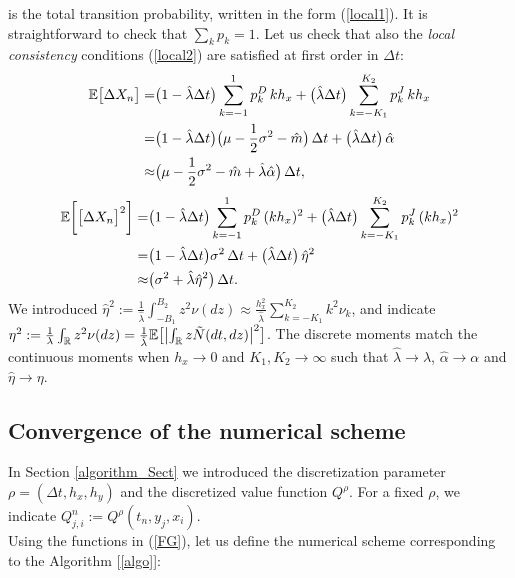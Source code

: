 is the total transition
probability, written in the form (\ref{local1}). It is straightforward to check that $\sum_k p_k =1$.  
Let us check that also the \emph{local consistency} conditions (\ref{local2}) are satisfied at first order in $\Delta t$:
\begin{align*}
\mathbb{E} \bigl[ \Delta X_n \bigr] =& \bigl(1 - \hat \lambda \Delta t \bigr) \sum_{k=-1}^1 p^D_k \, k h_x 
           + \bigl( \hat \lambda \Delta t \bigr) \sum_{k = -K_1}^{K_2} p^J_k \, k h_x \\
           =& \bigl(1 - \hat \lambda \Delta t \bigr) \bigl( \mu - \frac{1}{2}\sigma^2 -\hat m \bigr) \, \Delta t  
           + \bigl(\hat \lambda \Delta t \bigr) \, \hat \alpha \\
           \approx& \bigl( \mu - \frac{1}{2}\sigma^2 - \hat m + \hat \lambda \hat \alpha \bigr) \, \Delta t ,
\end{align*}
\begin{align*}
 \mathbb{E} \biggl[ \bigl[ \Delta X_n \bigr]^2 \biggr] =&
 \bigl(1 - \hat \lambda \Delta t \bigr) \sum_{k=-1}^1 p^D_k \, (k h_x)^2 + \bigl( \hat \lambda \Delta t \bigr) \sum_{k = -K_1}^{K_2} p^J_k \, (k h_x)^2 \\
           =& \bigl(1 - \hat \lambda \Delta t \bigr) \sigma^2 \, \Delta t  
           + \bigl(\hat \lambda \Delta t \bigr) \,  \hat \eta^2 \\
 \approx& \bigl( \sigma^2 + \hat \lambda \hat \eta^2 \bigr) \, \Delta t.
\end{align*}
We introduced $\hat \eta^2 := \frac{1}{\hat \lambda} \int_{-B_1}^{B_2} z^2 \nu(dz)  
\approx \frac{h_x^2}{\hat \lambda} \sum_{k = -K_1}^{K_2} k^2 \nu_k $, and indicate $\eta^2 := \frac{1}{\lambda} \int_{\mathbb{R}} z^2 \nu(dz) 
= \frac{1}{\hat \lambda} \mathbb{E} \bigl[ \bigl| \int_{\mathbb{R}} z \tilde N(dt,dz) \bigr|^2 \bigr]$.
The discrete moments match the continuous moments when 
$h_x \to 0$ and $K_1,K_2 \to \infty$ such that 
$\hat \lambda \to \lambda$,
$\hat \alpha \to \alpha$ and $\hat \eta \to \eta$.



\subsection{Convergence of the numerical scheme}

In Section \ref{algorithm_Sect} we introduced the discretization parameter $\rho = (\Delta t, h_x, h_y)$ and the discretized value function $Q^{\rho}$. 
For a fixed $\rho$, we indicate $Q^n_{j,i} := Q^{\rho}(t_n,y_j,x_i)$.\\
Using the functions in (\ref{FG}), let us define the numerical scheme corresponding to the Algorithm [\ref{algo}]:

